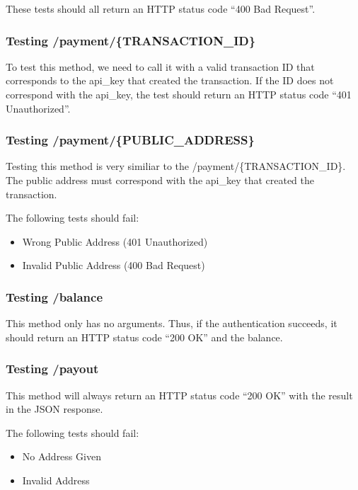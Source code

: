 These tests should all return an HTTP status code ``400 Bad Request''.

\subsubsection{Testing /payment/\{TRANSACTION\_ID\}}

To test this method, we need to call it with a valid transaction ID that corresponds to the api\_key that created the transaction. If the ID does not correspond with the api\_key, the test should return an HTTP status code ``401 Unauthorized''.

\subsubsection{Testing /payment/\{PUBLIC\_ADDRESS\}}

Testing this method is very similiar to the /payment/\{TRANSACTION\_ID\}. The public address must correspond with the api\_key that created the transaction. 

The following tests should fail:

\begin{itemize}
	\item Wrong Public Address (401 Unauthorized)
	\item Invalid Public Address (400 Bad Request)
\end{itemize}

\subsubsection{Testing /balance}

This method only has no arguments. Thus, if the authentication succeeds, it should return an HTTP status code ``200 OK'' and the balance.

\subsubsection{Testing /payout}

This method will always return an HTTP status code ``200 OK'' with the result in the JSON response. 

The following tests should fail:

\begin{itemize}
	\item No Address Given
	\item Invalid Address
\end{itemize}


